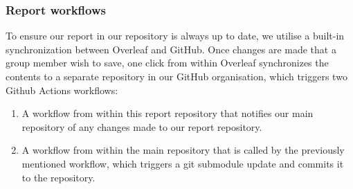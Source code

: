 \documentclass{article}
\begin{document}
\subsubsection{Report workflows}
To ensure our report in our repository is always up to date, we utilise a built-in synchronization between Overleaf and GitHub. Once changes are made that a group member wish to save, one click from within Overleaf synchronizes the contents to a separate repository in our GitHub organisation, which triggers two Github Actions workflows:
\begin{enumerate}
    \item A workflow from within this report repository that notifies our main repository of any changes made to our report repository.
    \item A workflow from within the main repository that is called by the previously mentioned workflow, which triggers a git submodule update and commits it to the repository.
\end{enumerate}
\end{document}
